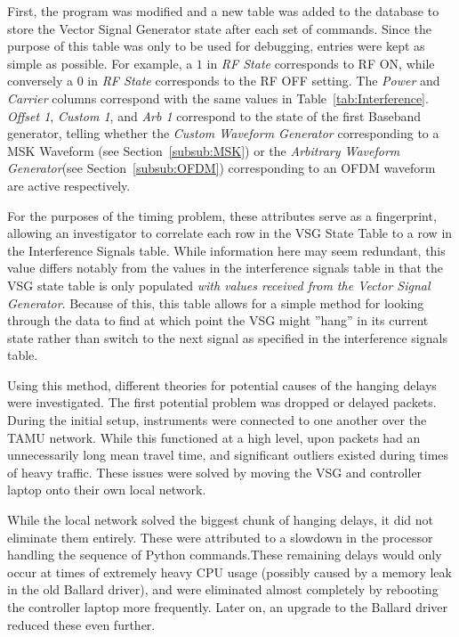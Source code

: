 	 First, the program was modified and a new table was added to the database to store the Vector Signal Generator state after each set of commands. Since the purpose of this table was only to be used for debugging, entries were kept as simple as possible. For example, a $1$ in \textit{RF State} corresponds to RF ON, while conversely a $0$ in \textit{RF State} corresponds to the RF OFF setting. The \textit{Power} and \textit{Carrier} columns correspond with the same values in Table~\ref{tab:Interference}. \textit{Offset 1}, \textit{Custom 1}, and \textit{Arb 1} correspond to the state of the first Baseband generator, telling whether the \textit{Custom Waveform Generator} corresponding to a MSK Waveform (see Section~\ref{subsub:MSK}) or the \textit{Arbitrary Waveform Generator}(see Section~\ref{subsub:OFDM}) corresponding to an OFDM waveform are active respectively. 
	 
For the purposes of the timing problem, these attributes serve as a fingerprint, allowing an investigator to correlate each row in the VSG State Table to a row in the Interference Signals table. While information here may seem redundant, this value differs notably from the values in the interference signals table in that the VSG state table is only populated \textit{with values received from the Vector Signal Generator}. Because of this, this table allows for a simple method for looking through the data to find at which point the VSG might ''hang'' in its current state rather than switch to the next signal as specified in the interference signals table. 

Using this method, different theories for potential causes of the hanging delays were investigated. The first potential problem was dropped or delayed packets. During the initial setup, instruments were connected to one another over the TAMU network. While this functioned at a high level, upon packets had an unnecessarily long mean travel time, and significant outliers existed during times of heavy traffic. These issues were solved by moving the VSG and controller laptop onto their own local network. 

 While the local network solved the biggest chunk of hanging delays, it did not eliminate them entirely. These were attributed to a slowdown in the processor handling the sequence of Python commands.These remaining delays would only occur at times of extremely heavy CPU usage (possibly caused by a memory leak in the old Ballard driver), and were eliminated almost completely by rebooting the controller laptop more frequently. Later on, an upgrade to the Ballard driver reduced these even further. 
 
